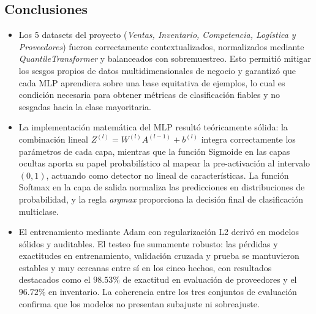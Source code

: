 \documentclass{article}
\begin{document}
\subsection{Conclusiones}
\begin{itemize}
    \item Los 5 datasets del proyecto (\textit{Ventas, Inventario, Competencia, Logística y Proveedores}) fueron correctamente contextualizados, normalizados mediante \textit{QuantileTransformer} y balanceados con sobremuestreo. Esto permitió mitigar los sesgos propios de datos multidimensionales de negocio y garantizó que cada MLP aprendiera sobre una base equitativa de ejemplos, lo cual es condición necesaria para obtener métricas de clasificación fiables y no sesgadas hacia la clase mayoritaria.
    \item La implementación matemática del MLP resultó teóricamente sólida: la combinación lineal $Z^{(l)} = W^{(l)}A^{(l-1)} + b^{(l)}$ integra correctamente los parámetros de cada capa, mientras que la función Sigmoide en las capas ocultas aporta su papel probabilístico al mapear la pre-activación al intervalo $(0,1)$, actuando como detector no lineal de características. La función Softmax en la capa de salida normaliza las predicciones en distribuciones de probabilidad, y la regla \textit{argmax} proporciona la decisión final de clasificación multiclase.
    \item El entrenamiento mediante Adam con regularización L2 derivó en modelos sólidos y auditables. El testeo fue sumamente robusto: las pérdidas y exactitudes en entrenamiento, validación cruzada y prueba se mantuvieron estables y muy cercanas entre sí en los cinco hechos, con resultados destacados como el $98.53\%$ de exactitud en evaluación de proveedores y el $96.72\%$ en inventario. La coherencia entre los tres conjuntos de evaluación confirma que los modelos no presentan subajuste ni sobreajuste.
\end{itemize}
\end{document}
